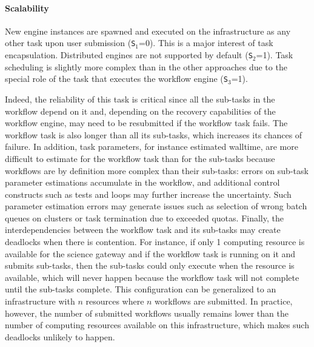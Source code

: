 \documentclass[preprint,3p,twocolumn]{elsarticle}
\newcommand{\note}[2]{\pdfmargincomment[color=yellow,author=#1,open=true]{#2}}
\newcommand{\closednote}[4]{} %
\begin{document}
\paragraph{Scalability}
New engine instances are spawned and executed on the infrastructure as
any other task upon user submission (\texttt{S$_1$}=0). This is a
major interest of task encapsulation. Distributed engines are not
supported by default (\texttt{S$_2$}=1). Task scheduling is slightly
more complex than in the other approaches due to the special role of
the task that executes the workflow engine (\texttt{S$_3$}=1). 
\closednote{sil}{i have the impression that the comments below are about robustness, and not so much about scalability. i also think that the level of detail here is much larger than in other 3.X sections. finally, i wonder whether what is explained here (which i must admit i could not follow completely in the scope of this evaluation or architectures) is valid only for this architecture in particular. i have the impression that this argument is more general }{Tristan}{Rejected :) See discussion in PR #20.}
Indeed,
the reliability of this task is critical since all the sub-tasks in
the workflow depend on it and, depending on the recovery capabilities
of the workflow engine, may need to be resubmitted if the workflow
task fails. The workflow task is also longer than all its sub-tasks,
which increases its chances of failure. In addition, task parameters,
for instance estimated walltime, are more difficult to estimate for
the workflow task than for the sub-tasks because workflows are by
definition more complex than their sub-tasks: errors on sub-task
parameter estimations accumulate in the workflow, and additional
control constructs such as tests and loops may further increase the
uncertainty. Such parameter estimation errors may generate issues such
as selection of wrong batch queues on clusters or task termination due
to exceeded quotas. \closednote{Naj}{The lay reader wonders why?  an
  example like the one offered for interdependencies can
  help}{Tristan}{Done, thanks.} Finally, the interdependencies between
the workflow task and its sub-tasks may create deadlocks when there is
contention. For instance, if only 1 computing resource is available
for the science gateway and if the workflow task is running on it and
submits sub-tasks, then the sub-tasks could only execute when the
resource is available, which will never happen because the workflow
task will not complete until the sub-tasks complete. This
configuration can be generalized to an infrastructure with $n$
resources where $n$ workflows are submitted. In practice, however, the
number of submitted workflows usually remains lower than the number of
computing resources available on this infrastructure, which makes such
deadlocks unlikely to happen. \closednote{Naj}{so is this the solution to
  fixing the above mentioned limitations with
  scalability?}{Tristan}{Unfortunately this is not a solution. We just
  say that this situation is unlikely to happen which is true.}
\end{document}
